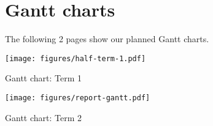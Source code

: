 \chapter{Gantt charts}\label{ch:gantt}

The following 2 pages show our planned Gantt charts.

\begin{landscape}

\begin{table}
    \texttt{[image: figures/half-term-1.pdf]}
    \caption{Gantt chart: Term 1}
    \label{table:gantt:term11}
\end{table}

\begin{table}[h!]
    \texttt{[image: figures/report-gantt.pdf]}
    \caption{Gantt chart: Term 2}
    \label{table:gantt:report}
\end{table}

\end{landscape}